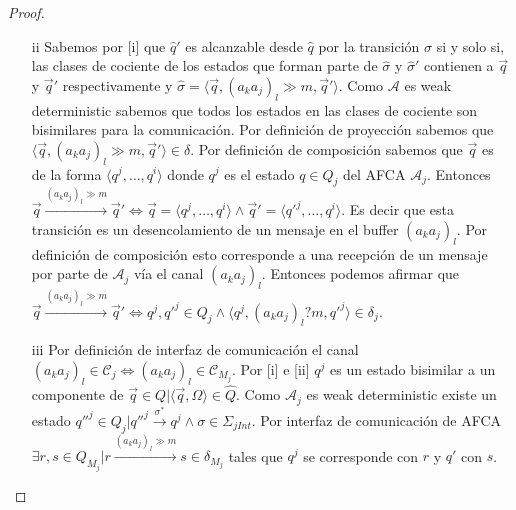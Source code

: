 \begin{prop}
\begin{proof}
\begin{itemize}
    \item[ii] Sabemos por [i] que $\hat{q}'$ es alcanzable desde $\hat{q}$ por la transición $\hat{\sigma}$ si y solo si, las clases de cociente de los estados que forman parte de $\hat{\sigma}$ y $\hat{\sigma}'$ contienen a $\overrightarrow{q}$ y $\overrightarrow{q}'$ respectivamente y $\hat{\sigma} = \langle \overrightarrow{q}, (a_ka_j)_l \gg m, \overrightarrow{q}' \rangle$. Como $\mathcal{A}$ es weak deterministic sabemos que todos los estados en las clases de cociente son bisimilares para la comunicación. Por definición de proyección sabemos que $\langle \overrightarrow{q}, (a_ka_j)_l \gg m, \overrightarrow{q}' \rangle \in \delta$. Por definición de composición sabemos que $\overrightarrow{q}$ es de la forma $\langle q^j, \ldots,q^i \rangle$ donde $q^j$ es el estado $q \in Q_j$ del AFCA $\mathcal{A}_j$. Entonces $\overrightarrow{q} \xrightarrow{(a_ka_j)_l \gg m} \overrightarrow{q}' \iff \overrightarrow{q}=\langle q^j, \ldots,q^i \rangle \land \overrightarrow{q}'=\langle q'^j, \ldots,q^i \rangle$. Es decir que esta transición es un desencolamiento de un mensaje en el buffer $(a_ka_j)_l$. Por definición de composición esto corresponde a una recepción de un mensaje por parte de $\mathcal{A}_j$ vía el canal $(a_ka_j)_l$. Entonces podemos afirmar que $\overrightarrow{q} \xrightarrow{(a_ka_j)_l \gg m} \overrightarrow{q}' \iff q^j,q'^j \in Q_j \land \langle q^j,(a_ka_j)_l?m, q'^j \rangle \in \delta_j$.
    
    \item[iii] Por definición de interfaz de comunicación el canal $(a_ka_j)_l \in \mathcal{C}_j \iff (a_ka_j)_l \in \mathcal{C}_{M_j}$. Por [i] e [ii] $q^j$ es un estado bisimilar a un componente de $\overrightarrow{q} \in Q | \langle \overrightarrow{q}, \Omega \rangle \in \hat{Q}$. Como $\mathcal{A}_j$ es weak deterministic existe un estado $q''^j \in Q_j | q''^j \xrightarrow{\sigma^*} q^j \land \sigma \in \Sigma_{jInt}$. Por interfaz de comunicación de AFCA $\exists r, s \in Q_{M_j} | r \xrightarrow{(a_ka_j)_l \gg m} s \in \delta_{M_j}$ tales que $q^j$ se corresponde con $r$ y $q'$ con $s$.  
    

\end{itemize}
\end{proof}
\end{prop}

